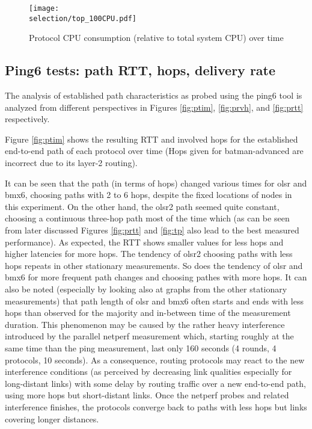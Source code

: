 \documentclass[a4paper,12pt,twoside]{article}
\begin{document}
\begin{figure}[!ht]
\centering
\texttt{[image: \\selection/top\_100CPU.pdf]}
\caption{Protocol CPU consumption (relative to total system CPU) over time}
\label{fig:cpu}
\end{figure}


\subsection{Ping6 tests: path RTT, hops, delivery rate}


The analysis of established path characteristics as probed using the
ping6 tool is analyzed from different perspectives in Figures
\ref{fig:ptim}, \ref{fig:prvh}, and \ref{fig:prtt} respectively. 

Figure \ref{fig:ptim} shows the resulting RTT and involved hops for
the established end-to-end path of each protocol over time (Hops given
for batman-advanced are incorrect due to its layer-2 routing).

It can be seen that the path (in terms of hops) changed various times
for olsr and bmx6, choosing paths with 2 to 6 hops, despite the fixed
locations of nodes in this experiment. On the other hand, the olsr2
path seemed quite constant, choosing a continuous three-hop path most
of the time which (as can be seen from later discussed Figures
\ref{fig:prtt} and \ref{fig:tp} also lead to the best measured
performance). As expected, the RTT shows smaller values for less hops
and higher latencies for more hops. The tendency of olsr2 choosing
paths with less hops repeats in other stationary measurements. So
does the tendency of olsr and bmx6 for more frequent path changes and
choosing pathes with more hops. It can also be noted (especially by
looking also at graphs from the other stationary measurements) that
path length of olsr and bmx6 often starts and ends with less hops than
observed for the majority and in-between time of the measurement
duration.  This phenomenon may be caused by the rather heavy
interference introduced by the parallel netperf measurement which,
starting roughly at the same time than the ping measurement, last only
160 seconds (4 rounds, 4 protocols, 10 seconds). As a consequence,
routing protocols may react to the new interference conditions (as
perceived by decreasing link qualities especially for long-distant
links) with some delay by routing traffic over a new end-to-end path,
using more hops but short-distant links.  Once the netperf probes and
related interference finishes, the protocols converge back to paths
with less hops but links covering longer distances.
\end{document}
